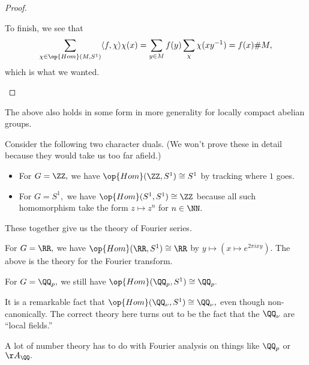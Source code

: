 \begin{proof}
\begin{itemize}
		To finish, we see that
		\[\sum_{\chi\in\op{Hom}(M,S^1)}\langle f,\chi\rangle\chi(x)=\sum_{y\in M}f(y)\sum_\chi\chi(xy^{-1})=f(x)\#M,\]
		which is what we wanted.
		\qedhere
	\end{itemize}
\end{proof}
The above also holds in some form in more generality for locally compact abelian groups.
\begin{example}
	Consider the following two character duals. (We won't prove these in detail because they would take us too far afield.)
	\begin{itemize}
		\item For $G=\ZZ,$ we have $\op{Hom}(\ZZ,S^1)\cong S^1$ by tracking where $1$ goes.
		\item For $G=S^1,$ we have $\op{Hom}(S^1,S^1)\cong\ZZ$ because all such homomorphism take the form $z\mapsto z^n$ for $n\in\NN.$
	\end{itemize}
	These together give us the theory of Fourier series.
\end{example}
\begin{example}
	For $G=\RR,$ we have $\op{Hom}(\RR,S^1)\cong\RR$ by $y\mapsto(x\mapsto e^{2\pi ixy}).$ The above is the theory for the Fourier transform.
\end{example}
\begin{example}
	For $G=\QQ_p,$ we still have $\op{Hom}(\QQ_p,S^1)\cong\QQ_p.$
\end{example}
\begin{remark}[Nir]
	It is a remarkable fact that $\op{Hom}(\QQ_\nu,S^1)\cong\QQ_\nu,$ even though non-canonically. The correct theory here turns out to be the fact that the $\QQ_\nu$ are ``local fields.''
\end{remark}
\begin{remark}
	A lot of number theory has to do with Fourier analysis on things like $\QQ_p$ or $\AA_\QQ.$
\end{remark}


